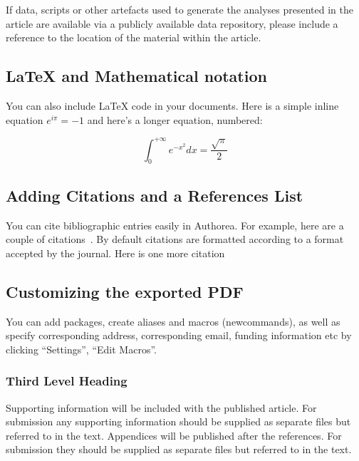 \documentclass[alpha-refs]{wiley-article}
\begin{document}
If data, scripts or other artefacts used to generate the analyses
presented in the article are available via a publicly available data
repository, please include a reference to the location of the material
within the article.

\par\null

\subsection*{LaTeX and Mathematical notation}
\label{sec:latex}
You can also include LaTeX code in your documents. Here is a simple inline equation $e^{i\pi}=-1$ and here's a longer equation, numbered:

\begin{equation}
\label{eqn:some}
\int_0^{+\infty}e^{-x^2}dx=\frac{\sqrt{\pi}}{2}
\end{equation}

\par\null

\subsection*{Adding Citations and a References
List}

You can cite bibliographic entries easily in Authorea. For example, here
are a couple of citations~\cite{Cavalleri_2016,Gregory_2015}. By default citations are
formatted according to a format accepted by the journal. Here is one
more citation~\cite{Meskine_2019}

\par\null

\subsection*{Customizing the exported
PDF}

{\label{730632}}

You can add packages, create aliases and macros (newcommands), as well
as specify corresponding address, corresponding email, funding
information etc by clicking ``Settings'', ``Edit Macros''.

\par\null

\subsubsection*{Third Level Heading}

Supporting information will be included with the published article. For
submission any supporting information should be supplied as separate
files but referred to in the text. Appendices will be published after
the references. For submission they should be supplied as separate files
but referred to in the text.
\end{document}
